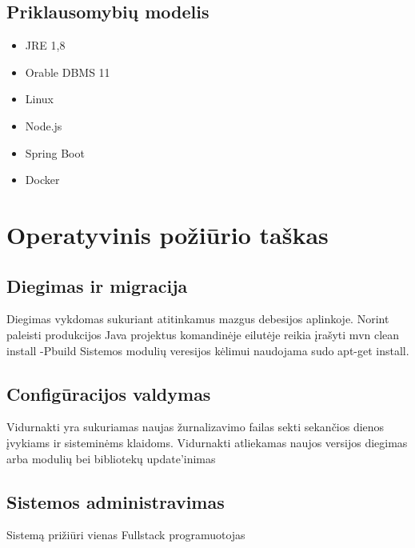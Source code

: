 \documentclass{VUMIFPSmagistrinis}
\begin{document}
			\subsection{Priklausomybių modelis}
				\begin{itemize}
					\item{JRE 1,8}
					\item{Orable DBMS 11}
					\item{Linux}
					\item{Node.js}
					\item{Spring Boot}
					\item{Docker}
				\end{itemize}
			
		\section{Operatyvinis požiūrio taškas}
			\subsection{Diegimas ir migracija}
				Diegimas vykdomas sukuriant atitinkamus mazgus debesijos aplinkoje.
				Norint paleisti produkcijos Java projektus komandinėje eilutėje reikia įrašyti mvn clean install -Pbuild
				Sistemos modulių veresijos kėlimui naudojama sudo apt-get install.
				
			\subsection{Configūracijos valdymas}
				Vidurnakti yra sukuriamas naujas žurnalizavimo failas sekti sekančios dienos įvykiams ir sisteminėms klaidoms.
				Vidurnakti atliekamas naujos versijos diegimas arba modulių bei bibliotekų update'inimas
			\subsection{Sistemos administravimas}
				Sistemą prižiūri vienas Fullstack programuotojas
	
\end{document}
